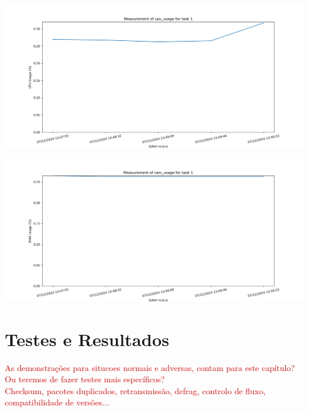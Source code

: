 \documentclass[a4paper,12pt]{scrreprt}
\begin{document}
\begin{minipage}{.5\textwidth}
    \centering
    \includegraphics[width=\textwidth]{img/analysis/cpu_usage.png}
    \label{fig:cpu_usage}
\end{minipage}
\hfill
\begin{minipage}{.5\textwidth}
    \centering
    \includegraphics[width=\textwidth]{img/analysis/ram_usage.png}
    \label{fig:ram_usage}
\end{minipage}




\chapter{Testes e Resultados}

\textcolor{red}{
    As demonstrações para situcoes normais e adversas, contam para este capítulo?
    Ou teremos de fazer testes mais específicos? \\
    Checksum, pacotes duplicados, retransmissão, defrag, controlo de fluxo, compatibilidade de versões...
}
\end{document}
